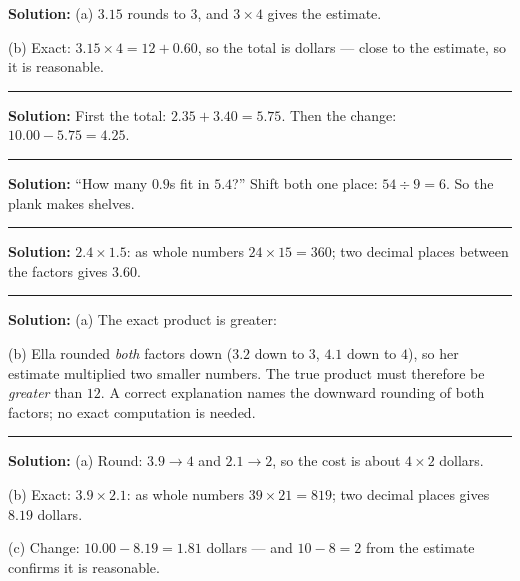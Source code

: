 \documentclass[12pt]{article}
\begin{document}

\textbf{Solution:}
(a) $3.15$ rounds to $3$, and $3 \times 4$ gives the estimate. 

(b) Exact: $3.15 \times 4 = 12 + 0.60$, so the total is  dollars
--- close to the estimate, so it is reasonable.

\vspace{0.2cm}\noindent\rule{\linewidth}{0.2pt}\vspace{0.1cm}


\textbf{Solution:} First the total: $2.35 + 3.40 = 5.75$. Then the change:
$10.00 - 5.75 = 4.25$. 

\vspace{0.2cm}\noindent\rule{\linewidth}{0.2pt}\vspace{0.1cm}


\textbf{Solution:} ``How many $0.9$s fit in $5.4$?'' Shift both one place:
$54 \div 9 = 6$. So the plank makes  shelves.

\vspace{0.2cm}\noindent\rule{\linewidth}{0.2pt}\vspace{0.1cm}


\textbf{Solution:} $2.4 \times 1.5$: as whole numbers $24 \times 15 = 360$;
two decimal places between the factors gives $3.60$. 

\vspace{0.2cm}\noindent\rule{\linewidth}{0.2pt}\vspace{0.1cm}


\textbf{Solution:}
(a) The exact product is greater: 

(b) Ella rounded \emph{both} factors down ($3.2$ down to $3$, $4.1$ down to
$4$), so her estimate multiplied two smaller numbers. The true product must
therefore be \emph{greater} than $12$. A correct explanation names the
downward rounding of both factors; no exact computation is needed.

\vspace{0.2cm}\noindent\rule{\linewidth}{0.2pt}\vspace{0.1cm}


\textbf{Solution:}
(a) Round: $3.9 \to 4$ and $2.1 \to 2$, so the cost is about $4 \times 2$
dollars. 

(b) Exact: $3.9 \times 2.1$: as whole numbers $39 \times 21 = 819$; two
decimal places gives $8.19$ dollars. 

(c) Change: $10.00 - 8.19 = 1.81$ dollars --- and $10 - 8 = 2$ from the
estimate confirms it is reasonable. 
\end{document}
